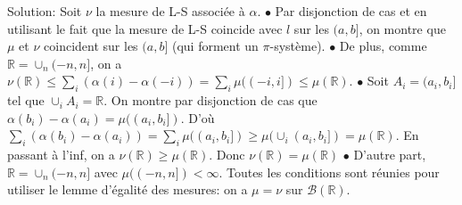 \documentclass{report}
\begin{document}
Solution: Soit $\nu$ la mesure de L-S associée à $\alpha$. \newline $\bullet$ Par disjonction de cas et en utilisant le fait que la mesure de L-S coincide avec $l$ sur les $(a,b]$,  on montre que $\mu$ et $\nu$ coincident sur les $(a,b]$ (qui forment un $\pi$-système). \newline $\bullet$ De plus, comme $\mathbb R = \cup_n (-n,n]$, on a $\nu(\mathbb R) \leq \sum_i (\alpha(i)-\alpha(-i)) = \sum_i \mu((-i,i])\leq \mu(\mathbb R)$. \newline $\bullet$ Soit $A_i = (a_i,b_i]$ tel que $\cup_i A_i = \mathbb R$. On montre par disjonction de cas que $\alpha(b_i)-\alpha(a_i)=  \mu((a_i,b_i])$. D'où $\sum_i (\alpha(b_i)-\alpha(a_i)) = \sum_i \mu((a_i,b_i]) \geq \mu(\cup_i(a_i,b_i]) = \mu(\mathbb R)$. En passant à l'inf, on a $\nu(\mathbb R)\geq \mu(\mathbb R)$. \newline Donc $\nu(\mathbb R)= \mu(\mathbb R)$ \newline $\bullet$ D'autre part, $\mathbb R = \cup_n (-n,n]$ avec $\mu((-n,n])< \infty $. \newline \newline
Toutes les conditions sont réunies pour utiliser le lemme d'égalité des mesures: on a $\mu = \nu$ sur $\mathcal B(\mathbb R)$.

\subsection{}  \\\\
\end{document}

